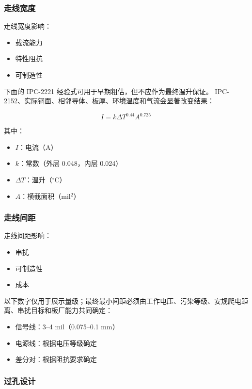 \subsubsection{走线宽度}

走线宽度影响：
\begin{itemize}
  \item 载流能力
  \item 特性阻抗
  \item 可制造性
\end{itemize}

下面的 IPC-2221 经验式可用于早期粗估，但不应作为最终温升保证。
IPC-2152、实际铜面、相邻导体、板厚、环境温度和气流会显著改变结果：

\begin{equation}
I = k \Delta T^{0.44} A^{0.725} \label{eq:trace-current}
\end{equation}

其中：
\begin{itemize}
  \item $I$：电流（A）
  \item $k$：常数（外层 0.048，内层 0.024）
  \item $\Delta T$：温升（$^\circ$C）
  \item $A$：横截面积（mil$^2$）
\end{itemize}

\subsubsection{走线间距}

走线间距影响：
\begin{itemize}
  \item 串扰
  \item 可制造性
  \item 成本
\end{itemize}

以下数字仅用于展示量级；最终最小间距必须由工作电压、污染等级、安规爬电距离、串扰目标和板厂能力共同确定：
\begin{itemize}
  \item 信号线：3--4 mil（0.075--0.1 mm）
  \item 电源线：根据电压等级确定
  \item 差分对：根据阻抗要求确定
\end{itemize}

\subsubsection{过孔设计}

